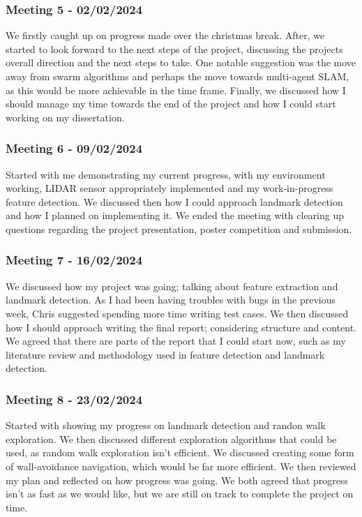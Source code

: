\documentclass[12pt]{article}
\begin{document}
\subsubsection{Meeting 5 - 02/02/2024}
We firstly caught up on progress made over the christmas break. After, we started to look forward to the next steps of the project,
discussing the projects overall direction and the next steps to take. One notable suggestion was the move away from swarm algorithms
and perhaps the move towards multi-agent SLAM, as this would be more achievable in the time frame. Finally, we discussed how I
should manage my time towards the end of the project and how I could start working on my dissertation.
\subsubsection{Meeting 6 - 09/02/2024}
Started with me demonstrating my current progress, with my environment working, LIDAR sensor appropriately implemented and
my work-in-progress feature detection. We discussed then how I could approach landmark detection and how I planned on implementing
it. We ended the meeting with clearing up questions regarding the project presentation, poster competition and submission.
\subsubsection{Meeting 7 - 16/02/2024}
We discussed how my project was going; talking about feature extraction and landmark detection. As I had been having troubles
with bugs in the previous week, Chris suggested spending more time writing test cases. We then discussed how I should approach
writing the final report; considering structure and content. We agreed that there are parts of the report that I could start
now, such as my literature review and methodology used in feature detection and landmark detection.
\subsubsection{Meeting 8 - 23/02/2024}
Started with showing my progress on landmark detection and randon walk exploration. We then discussed different exploration
algorithms that could be used, as random walk exploration isn't efficient. We discussed creating some form of wall-avoidance
navigation, which would be far more efficient. We then reviewed my plan and reflected on how progress was going. We both
agreed that progress isn't as fast as we would like, but we are still on track to complete the project on time.
\end{document}
